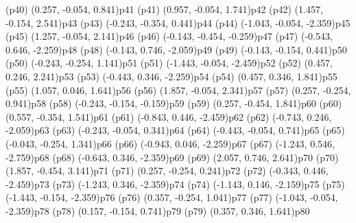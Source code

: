 \psdot[fillcolor=white](p40)
\psPoint(0.257, -0.054, 0.841){p41}
\psdot[fillcolor=white](p41)
\psPoint(0.957, -0.054, 1.741){p42}
\psdot[fillcolor=gray](p42)
\psPoint(1.457, -0.154, 2.541){p43}
\psdot[fillcolor=gray](p43)
\psPoint(-0.243, -0.354, 0.441){p44}
\psdot[fillcolor=white](p44)
\psPoint(-1.043, -0.054, -2.359){p45}
\psdot[fillcolor=gray](p45)
\psPoint(1.257, -0.054, 2.141){p46}
\psdot[fillcolor=gray](p46)
\psPoint(-0.143, -0.454, -0.259){p47}
\psdot[fillcolor=gray](p47)
\psPoint(-0.543, 0.646, -2.259){p48}
\psdot[fillcolor=gray](p48)
\psPoint(-0.143, 0.746, -2.059){p49}
\psdot[fillcolor=gray](p49)
\psPoint(-0.143, -0.154, 0.441){p50}
\psdot[fillcolor=white](p50)
\psPoint(-0.243, -0.254, 1.141){p51}
\psdot[fillcolor=white](p51)
\psPoint(-1.443, -0.054, -2.459){p52}
\psdot[fillcolor=white](p52)
\psPoint(0.457, 0.246, 2.241){p53}
\psdot[fillcolor=white](p53)
\psPoint(-0.443, 0.346, -2.259){p54}
\psdot[fillcolor=gray](p54)
\psPoint(0.457, 0.346, 1.841){p55}
\psdot[fillcolor=white](p55)
\psPoint(1.057, 0.046, 1.641){p56}
\psdot[fillcolor=gray](p56)
\psPoint(1.857, -0.054, 2.341){p57}
\psdot[fillcolor=gray](p57)
\psPoint(0.257, -0.254, 0.941){p58}
\psdot[fillcolor=gray](p58)
\psPoint(-0.243, -0.154, -0.159){p59}
\psdot[fillcolor=white](p59)
\psPoint(0.257, -0.454, 1.841){p60}
\psdot[fillcolor=white](p60)
\psPoint(0.557, -0.354, 1.541){p61}
\psdot[fillcolor=gray](p61)
\psPoint(-0.843, 0.446, -2.459){p62}
\psdot[fillcolor=gray](p62)
\psPoint(-0.743, 0.246, -2.059){p63}
\psdot[fillcolor=gray](p63)
\psPoint(-0.243, -0.054, 0.341){p64}
\psdot[fillcolor=white](p64)
\psPoint(-0.443, -0.054, 0.741){p65}
\psdot[fillcolor=white](p65)
\psPoint(-0.043, -0.254, 1.341){p66}
\psdot[fillcolor=white](p66)
\psPoint(-0.943, 0.046, -2.259){p67}
\psdot[fillcolor=gray](p67)
\psPoint(-1.243, 0.546, -2.759){p68}
\psdot[fillcolor=white](p68)
\psPoint(-0.643, 0.346, -2.359){p69}
\psdot[fillcolor=gray](p69)
\psPoint(2.057, 0.746, 2.641){p70}
\psdot[fillcolor=white](p70)
\psPoint(1.857, -0.454, 3.141){p71}
\psdot[fillcolor=gray](p71)
\psPoint(0.257, -0.254, 0.241){p72}
\psdot[fillcolor=gray](p72)
\psPoint(-0.343, 0.446, -2.459){p73}
\psdot[fillcolor=gray](p73)
\psPoint(-1.243, 0.346, -2.359){p74}
\psdot[fillcolor=white](p74)
\psPoint(-1.143, 0.146, -2.159){p75}
\psdot[fillcolor=white](p75)
\psPoint(-1.443, -0.154, -2.359){p76}
\psdot[fillcolor=white](p76)
\psPoint(0.357, -0.254, 1.041){p77}
\psdot[fillcolor=gray](p77)
\psPoint(-1.043, -0.054, -2.359){p78}
\psdot[fillcolor=gray](p78)
\psPoint(0.157, -0.154, 0.741){p79}
\psdot[fillcolor=white](p79)
\psPoint(0.357, 0.346, 1.641){p80}
